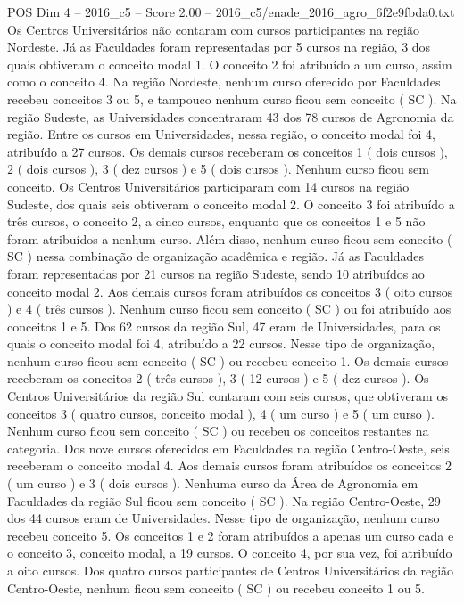 \begin{textsample}{POS Dim 4 – 2016\_c5 – Score 2.00 – 2016\_c5/enade\_2016\_agro\_6f2e9fbda0.txt}
Os Centros Universitários não contaram com cursos participantes na região Nordeste.
Já as Faculdades foram representadas por 5 cursos na região, 3 dos quais obtiveram o conceito modal 1.
O conceito 2 foi atribuído a um curso, assim como o conceito 4.
Na região Nordeste, nenhum curso oferecido por Faculdades recebeu conceitos 3 ou 5, e tampouco nenhum curso ficou sem conceito ( SC ).
Na região Sudeste, as Universidades concentraram 43 dos 78 cursos de Agronomia da região.
Entre os cursos em Universidades, nessa região, o conceito modal foi 4, atribuído a 27 cursos.
Os demais cursos receberam os conceitos 1 ( dois cursos ), 2 ( dois cursos ), 3 ( dez cursos ) e 5 ( dois cursos ).
Nenhum curso ficou sem conceito.
Os Centros Universitários participaram com 14 cursos na região Sudeste, dos quais seis obtiveram o conceito modal 2.
O conceito 3 foi atribuído a três cursos, o conceito 2, a cinco cursos, enquanto que os conceitos 1 e 5 não foram atribuídos a nenhum curso.
Além disso, nenhum curso ficou sem conceito ( SC ) nessa combinação de organização acadêmica e região.
Já as Faculdades foram representadas por 21 cursos na região Sudeste, sendo 10 atribuídos ao conceito modal 2.
Aos demais cursos foram atribuídos os conceitos 3 ( oito cursos ) e 4 ( três cursos ).
Nenhum curso ficou sem conceito ( SC ) ou foi atribuído aos conceitos 1 e 5.
Dos 62 cursos da região Sul, 47 eram de Universidades, para os quais o conceito modal foi 4, atribuído a 22 cursos.
Nesse tipo de organização, nenhum curso ficou sem conceito ( SC ) ou recebeu conceito 1.
Os demais cursos receberam os conceitos 2 ( três cursos ), 3 ( 12 cursos ) e 5 ( dez cursos ).
Os Centros Universitários da região Sul contaram com seis cursos, que obtiveram os conceitos 3 ( quatro cursos, conceito modal ), 4 ( um curso ) e 5 ( um curso ).
Nenhum curso ficou sem conceito ( SC ) ou recebeu os conceitos restantes na categoria.
Dos nove cursos oferecidos em Faculdades na região Centro-Oeste, seis receberam o conceito modal 4.
Aos demais cursos foram atribuídos os conceitos 2 ( um curso ) e 3 ( dois cursos ).
Nenhuma curso da Área de Agronomia em Faculdades da região Sul ficou sem conceito ( SC ).
Na região Centro-Oeste, 29 dos 44 cursos eram de Universidades.
Nesse tipo de organização, nenhum curso recebeu conceito 5.
Os conceitos 1 e 2 foram atribuídos a apenas um curso cada e o conceito 3, conceito modal, a 19 cursos.
O conceito 4, por sua vez, foi atribuído a oito cursos.
Dos quatro cursos participantes de Centros Universitários da região Centro-Oeste, nenhum ficou sem conceito ( SC ) ou recebeu conceito 1 ou 5.

\end{textsample}
